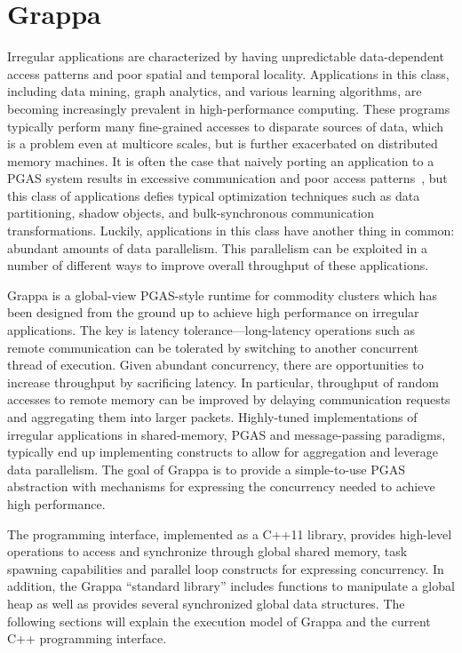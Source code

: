 \section{Grappa}

Irregular applications are characterized by having unpredictable data-dependent access patterns and poor spatial and temporal locality. Applications in this class, including data mining, graph analytics, and various learning algorithms, are becoming increasingly prevalent in high-performance computing. These programs typically perform many fine-grained accesses to disparate sources of data, which is a problem even at multicore scales, but is further exacerbated on distributed memory machines.
It is often the case that naively porting an application to a PGAS system results in excessive communication and poor access patterns~\cite{pgas-analysis}, but this class of applications defies typical optimization techniques such as data partitioning, shadow objects, and bulk-synchronous communication transformations.
Luckily, applications in this class have another thing in common: abundant amounts of data parallelism. This parallelism can be exploited in a number of different ways to improve overall throughput of these applications.


Grappa is a global-view PGAS-style runtime for commodity clusters which has been designed from the ground up to achieve high performance on irregular applications. The key is latency tolerance---long-latency operations such as remote communication can be tolerated by switching to another concurrent thread of execution. Given abundant  concurrency, there are opportunities to increase throughput by sacrificing latency. In particular, throughput of random accesses to remote memory can be improved by delaying communication requests and aggregating them into larger packets. Highly-tuned implementations of irregular applications in shared-memory, PGAS and message-passing paradigms, typically end up implementing constructs to allow for aggregation and leverage data parallelism. The goal of Grappa is to provide a simple-to-use PGAS abstraction with mechanisms for expressing the concurrency needed to achieve high performance.

The programming interface, implemented as a C++11 library, provides high-level operations to access and synchronize through global shared memory, task spawning capabilities and parallel loop constructs for expressing concurrency. In addition, the Grappa ``standard library'' includes functions to manipulate a global heap as well as provides several synchronized global data structures. The following sections will explain the execution model of Grappa and the current C++ programming interface.

